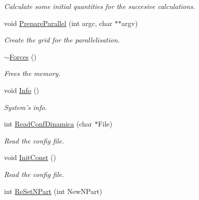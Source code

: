 \begin{DoxyCompactItemize}
\begin{DoxyCompactList}\small\item\em \-Calculate some initial quantities for the succesive calculations. \end{DoxyCompactList}\item 
\hypertarget{classForces_afb0db3e5d9d3ca56511f4942b695a33c}{void \hyperlink{classForces_afb0db3e5d9d3ca56511f4942b695a33c}{\-Prepare\-Parallel} (int argc, char $\ast$$\ast$argv)}\label{classForces_afb0db3e5d9d3ca56511f4942b695a33c}

\begin{DoxyCompactList}\small\item\em \-Create the grid for the parallelisation. \end{DoxyCompactList}\item 
\hypertarget{classForces_ad23deb6f28e0c4e08e69556f04028e82}{\hyperlink{classForces_ad23deb6f28e0c4e08e69556f04028e82}{$\sim$\-Forces} ()}\label{classForces_ad23deb6f28e0c4e08e69556f04028e82}

\begin{DoxyCompactList}\small\item\em \-Frees the memory. \end{DoxyCompactList}\item 
\hypertarget{classForces_a632d50bc6acb5d08614d0f99a7ed7293}{void \hyperlink{classForces_a632d50bc6acb5d08614d0f99a7ed7293}{\-Info} ()}\label{classForces_a632d50bc6acb5d08614d0f99a7ed7293}

\begin{DoxyCompactList}\small\item\em \-System's info. \end{DoxyCompactList}\item 
\hypertarget{classForces_a54e451b95d534ac661b873f7c5773435}{int \hyperlink{classForces_a54e451b95d534ac661b873f7c5773435}{\-Read\-Conf\-Dinamica} (char $\ast$\-File)}\label{classForces_a54e451b95d534ac661b873f7c5773435}

\begin{DoxyCompactList}\small\item\em \-Read the config file. \end{DoxyCompactList}\item 
\hypertarget{classForces_a2d9aa5d817b97aecdc4dc418d1be255c}{void \hyperlink{classForces_a2d9aa5d817b97aecdc4dc418d1be255c}{\-Init\-Const} ()}\label{classForces_a2d9aa5d817b97aecdc4dc418d1be255c}

\begin{DoxyCompactList}\small\item\em \-Read the config file. \end{DoxyCompactList}\item 
\hypertarget{classForces_a2bd0476e620e68ae04990018f4520bf6}{int \hyperlink{classForces_a2bd0476e620e68ae04990018f4520bf6}{\-Re\-Set\-N\-Part} (int \-New\-N\-Part)}\label{classForces_a2bd0476e620e68ae04990018f4520bf6}


\end{DoxyCompactItemize}
